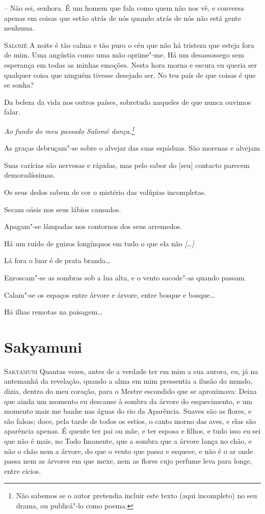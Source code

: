 -- Não sei, senhora. É um homem que fala como quem não nos vê, e
conversa apenas em coisas que estão atrás de nós quando atrás de nós
não está gente nenhuma.

\textsc{Salomé} A noite é tão calma e tão puro o céu que não há tristeza
que esteja fora de mim. Uma angústia como uma mão oprime"-me. Há um
desassossego sem esperança em todas as minhas emoções. Nesta hora
morna e escura eu queria ser qualquer coisa que ninguém tivesse
desejado ser. No teu país de que coisas é que se sonha?

Da beleza da vida nos outros países, sobretudo naqueles de que nunca
ouvimos falar.

\asterisc 

{\itshape
Ao fundo do meu passado Salomé dança.\footnote{ Não sabemos
se o autor pretendia incluir este texto (aqui incompleto) no seu
drama, ou publicá"-lo como poema.}

As graças debruçam"-se sobre o alvejar das suas espáduas. 
São morenas e alvejam 

Suas carícias são nervosas e rápidas, mas pelo sabor do $[$seu$]$
contacto parecem demoradíssimas.

Os seus dedos sabem de cor o mistério das volúpias incompletas.

Secam oásis nos seus lábios cansados. 

Apagam"-se lâmpadas nos contornos dos seus arremedos. 

Há um ruído de guizos longínquos em tudo o que ela não \emph{[\ldots{}]}

Lá fora o luar é de prata branda\ldots{} 

Enroscam"-se as sombras sob a lua alta, e o vento sacode"-as
quando passam. 

Calam"-se os espaços entre árvore e árvore, entre bosque e
bosque\ldots{} 

Há ilhas remotas na paisagem\ldots{} 
}

\chapter{Sakyamuni}

\textsc{Sakyamuni} Quantas vezes, antes de a verdade ter em mim a sua aurora,
eu, já na antemanhã da revelação, quando a alma em mim pressentia a
ilusão do mundo, dizia, dentro do meu coração, para o Mestre
escondido que se aproximava: Deixa que ainda um momento eu descanse à
sombra da árvore do esquecimento, e um momento mais me banhe nas
águas do rio da Aparência. Suaves são as flores, e são falsas; doce,
pela tarde de todos os estios, o canto morno das aves, e elas são
aparência apenas. É quente ter pai ou mãe, e ter esposa e filhos, e
tudo isso eu sei que não é mais, no Todo Imanente, que a sombra que a
árvore lança no chão, e não o chão nem a árvore, do que o vento que
passa e esquece, e não é o ar onde passa nem as árvores em que mexe,
nem as flores cujo perfume leva para longe, entre cicios.

